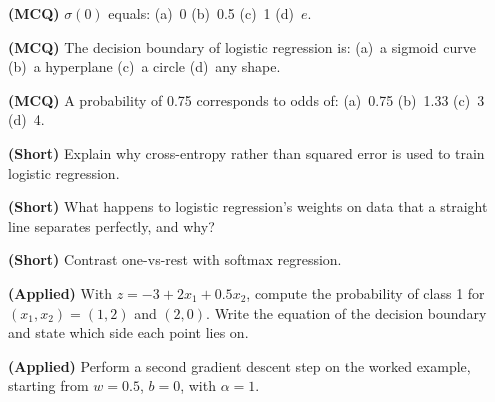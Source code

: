 \begin{reviewq}
  \item \textbf{(MCQ)} $\sigma(0)$ equals: (a)~0 (b)~0.5 (c)~1 (d)~$e$.
  \item \textbf{(MCQ)} The decision boundary of logistic regression is:
        (a)~a sigmoid curve (b)~a hyperplane (c)~a circle (d)~any shape.
  \item \textbf{(MCQ)} A probability of 0.75 corresponds to odds of: (a)~0.75
        (b)~1.33 (c)~3 (d)~4.
  \item \textbf{(Short)} Explain why cross-entropy rather than squared error is
        used to train logistic regression.
  \item \textbf{(Short)} What happens to logistic regression's weights on data
        that a straight line separates perfectly, and why?
  \item \textbf{(Short)} Contrast one-vs-rest with softmax regression.
  \item \textbf{(Applied)} With $z = -3 + 2x_1 + 0.5x_2$, compute the probability
        of class 1 for $(x_1, x_2) = (1, 2)$ and $(2, 0)$. Write the equation of
        the decision boundary and state which side each point lies on.
  \item \textbf{(Applied)} Perform a second gradient descent step on the worked
        example, starting from $w = 0.5$, $b = 0$, with $\alpha = 1$.
\end{reviewq}
